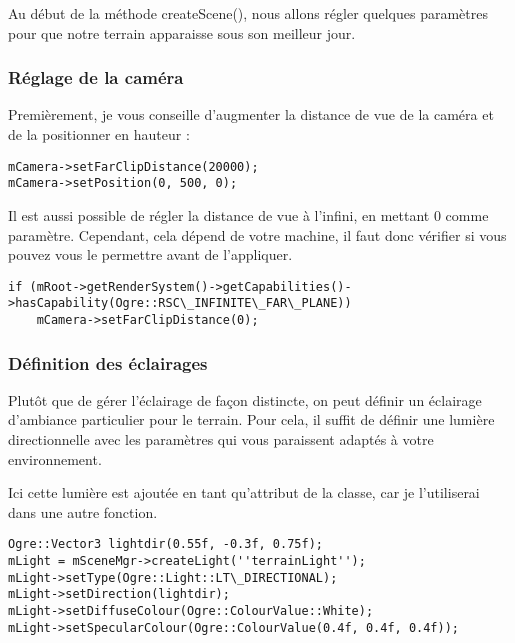 \documentclass[10pt,a4paper]{report}
\begin{document}
Au d\'ebut de la m\'ethode createScene(), nous allons r\'egler quelques param\`etres pour que notre terrain apparaisse sous son meilleur jour.

\subsubsection{R\'eglage de la cam\'era}
Premi\`erement, je vous conseille d'augmenter la distance de vue de la cam\'era et de la positionner en hauteur :

\begin{lstlisting}[caption={R\'eglage de la cam\'era}]
mCamera->setFarClipDistance(20000);
mCamera->setPosition(0, 500, 0);
\end{lstlisting}

Il est aussi possible de r\'egler la distance de vue \`a l'infini, en mettant 0 comme param\`etre. Cependant, cela d\'epend de votre machine, il faut donc v\'erifier si vous pouvez vous le permettre avant de l'appliquer.

\begin{lstlisting}[caption={V\'erification et r\'eglages de vue \`a l'infini}]
if (mRoot->getRenderSystem()->getCapabilities()->hasCapability(Ogre::RSC\_INFINITE\_FAR\_PLANE))
    mCamera->setFarClipDistance(0);
\end{lstlisting}




\subsubsection{D\'efinition des \'eclairages}
Plut\^ot que de g\'erer l'\'eclairage de fa\c{c}on distincte, on peut d\'efinir un \'eclairage d'ambiance particulier pour le terrain. Pour cela, il suffit de d\'efinir une lumi\`ere directionnelle avec les param\`etres qui vous paraissent adapt\'es \`a votre environnement. 

Ici cette lumi\`ere est ajout\'ee en tant qu'attribut de la classe, car je l'utiliserai dans une autre fonction.

\begin{lstlisting}[caption={D\'efinition de l'\'eclairage pour le terrain}]
Ogre::Vector3 lightdir(0.55f, -0.3f, 0.75f);
mLight = mSceneMgr->createLight(''terrainLight'');
mLight->setType(Ogre::Light::LT\_DIRECTIONAL);
mLight->setDirection(lightdir);
mLight->setDiffuseColour(Ogre::ColourValue::White);
mLight->setSpecularColour(Ogre::ColourValue(0.4f, 0.4f, 0.4f));
\end{lstlisting}
\end{document}
